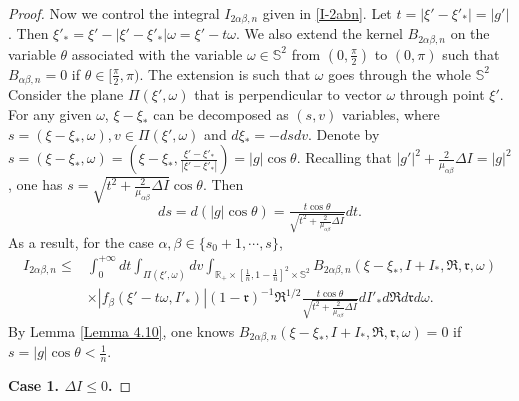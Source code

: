 \documentclass[reqno,11pt]{amsart}
\numberwithin{equation}{section}
\def\R{\mathbb{R}}
\begin{document}
\begin{proof}
Now we control the integral $I_{2 \alpha \beta, n}$ given in \eqref{I-2abn}. Let $t=|\xi'-\xi'_* | = |g'|$. Then $\xi'_* = \xi' - |\xi'-\xi'_* |\omega = \xi' - t \omega$. We also extend the kernel $B_{2 \alpha \beta, n}$ on the variable $\theta$ associated with the variable $\omega \in \mathbb{S}^2$ from $(0, \frac{\pi}{2})$ to $(0, \pi)$ such that $B_{\alpha \beta ,n}=0 $ if $\theta\in [\frac{\pi}{2} ,\pi )$. The extension is such that $\omega$ goes through the whole $\mathbb{S}^2$ Consider the plane $\Pi (\xi' ,\omega )$ that is perpendicular to vector $\omega $ through point $\xi'$. For any given $\omega$, $  \xi- \xi_*$ can be decomposed as $(s,v)$ variables, where $s=(\xi -\xi_*,\omega ), v\in \Pi (\xi', \omega )$ and $d\xi_* =-dsdv$. Denote by $s=(\xi -\xi_* ,\omega ) = (\xi -\xi_* , \frac{\xi' -\xi'_* }{|\xi'-\xi'_*|})=|g|\cos \theta$. Recalling that $|g'|^2 + \tfrac{2}{\mu_{ \alpha \beta }} \Delta I = |g|^2$, one has $s = \sqrt{t^2+\frac{2}{\mu_{\alpha \beta }}\Delta I } \cos \theta$. Then
	\begin{equation*}
		ds=d(|g| \cos \theta )=\tfrac{t \cos \theta }{\sqrt{t^2+\frac{2}{\mu_{\alpha \beta }}\Delta I }} dt.
	\end{equation*}
As a result, for the case $ \alpha ,\beta \in \{s_0+1,\cdots,s\}$, 
\begin{equation}\label{I-2abn-1}
\begin{aligned}
I_{2 \alpha \beta, n} \leq & \int_{0}^{+\infty} dt \int_{\Pi (\xi' ,\omega )}  dv \int_{\R_+ \times [\frac{1}{n},1-\frac{1}{n} ]^2 \times \mathbb{S}^2 } B_{2\alpha \beta ,n} (\xi-\xi_*,I+I_*,\mathfrak{R},\mathfrak{r},\omega ) \\
&\times | f_{\beta }(\xi'-t\omega ,I'_*) | (1-\mathfrak{r})^{-1}\mathfrak{R}^{1/2} \tfrac{t \cos \theta }{\sqrt{t^2+\frac{2}{\mu_{\alpha \beta }}\Delta I }}dI'_* d\mathfrak{R}d\mathfrak{r}d\omega.    
\end{aligned}
\end{equation}
By Lemma \ref{Lemma 4.10}, one knows $B_{2\alpha \beta ,n} (\xi-\xi_*,I+I_*,\mathfrak{R},\mathfrak{r},\omega ) =0$ if $s=|g|\cos \theta <\frac{1}{n}$.

{\bf Case 1. $\Delta I \leq 0$.}
	

\end{proof}
\end{document}
